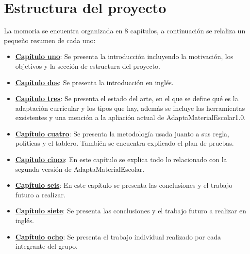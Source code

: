 \section{Estructura del proyecto}\label{cap:estructura}
La momoria se encuentra organizada en 8 capítulos, a continuación se relaliza un pequeño resumen de cada uno:
\begin{itemize}
    \item \textbf{\hyperref[ch:introduccion]{Capítulo uno}}: Se presenta la introducción incluyendo la motivación, los objetivos y la sección de estructura del proyecto.
    \item \textbf{\hyperref[cap:introduction]{Capítulo dos}}: Se presenta la introducción en inglés. 
    \item \textbf{\hyperref[cap:estadoDelArte]{Capítulo tres}}: Se presenta el estado del arte, en el que se define qué es la adaptación curricular y los tipos que hay, además se incluye las herramientas exsistentes y una mención a la apliación actual de  AdaptaMaterialEscolar1.0.
    \item \textbf{\hyperref[cap:metodologia]{Capítulo cuatro}}: Se presenta la metodología usada juanto a sus regla, políticas y el tablero. También se encuentra explicado el plan de pruebas.
    \item \textbf{\hyperref[cap:AdaptaMaterialEscolar2.0]{Capítulo cinco}}: En este capítulo se explica todo lo relacionado con la segunda versión de AdaptaMaterialEscolar.
    \item \textbf{\hyperref[cap:conclusiones]{Capítulo seis}}: En este capítulo se presenta las conclusiones y el trabajo futuro a realizar.
    \item \textbf{\hyperref[cap:conclusions]{Capítulo siete}}: Se presenta las conclusiones y el trabajo futuro a realizar en inglés.
    \item \textbf{\hyperref[cap:trabajo_individual]{Capítulo ocho}}: Se presenta el trabajo individual realizado por cada integrante del grupo.
\end{itemize}